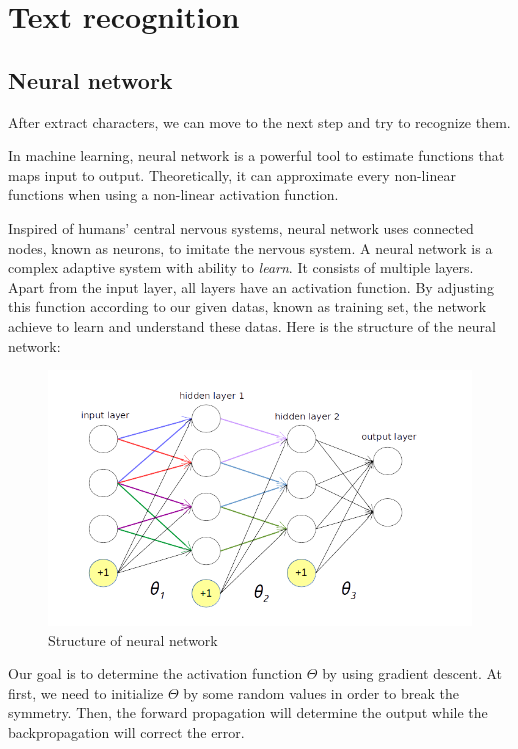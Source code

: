 \documentclass[paper=a4, french, 11pt]{scrartcl}
\begin{document}
\section{Text recognition} \mbox{} \vspace{-0.5cm}

\subsection{Neural network} \mbox{} \vspace{-0.5cm}

After extract characters, we can move to the next step and try to recognize them.

In machine learning, neural network is a powerful tool to estimate functions that maps input to output. Theoretically, it can approximate every non-linear functions when using a non-linear activation function. 

Inspired of humans' central nervous systems, neural network uses connected nodes, known as neurons, to imitate the nervous system. A neural network is a complex adaptive system with ability to \textit{learn}. It consists of multiple layers. Apart from the input layer, all layers have an activation function. By adjusting this function according to our given datas, known as training set, the network achieve to learn and understand these datas. Here is the structure of the neural network:

\begin{figure}[h]
\begin{center}
	\vspace{-1ex}
   \includegraphics[width=0.75\linewidth]{network.png}
\end{center}
\vspace{-4ex}
\caption{Structure of neural network}
\label{fig:heatmap}
\end{figure}

Our goal is to determine the activation function $\Theta$ by using gradient descent. At first, we need to initialize $\Theta$ by some random values in order to break the symmetry. Then, the forward propagation will determine the output while the backpropagation will correct the error.
\end{document}

